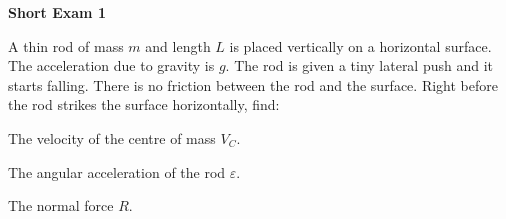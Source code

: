 \documentclass[../TST.tex]{subfiles}
\begin{document}
\begin{large}
	\textbf{Short Exam 1}
\end{large}

\begin{sproblem}
A thin rod of mass $m$ and length $L$ is placed vertically on a horizontal surface. The acceleration due to gravity is $g$. The rod is given a tiny lateral push and it starts falling. There is no friction between the rod and the surface. Right before the rod strikes the surface horizontally, find:
\begin{subpart}
	\item The velocity of the centre of mass $V_C$.
	\item The angular acceleration of the rod $\varepsilon$.
	\item The normal force $R$.
\end{subpart}
\end{sproblem}
\end{document}
